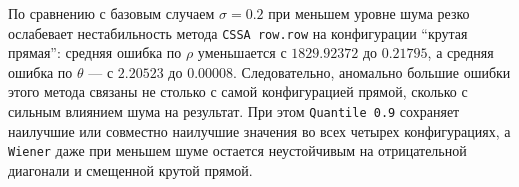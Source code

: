 По сравнению с базовым случаем $\sigma=0.2$ при меньшем уровне шума резко
ослабевает нестабильность метода \texttt{CSSA row.row} на конфигурации
``крутая прямая'': средняя ошибка по $\rho$ уменьшается с $1829.92372$ до
$0.21795$, а средняя ошибка по $\theta$ --- с $2.20523$ до $0.00008$.
Следовательно, аномально большие ошибки этого метода связаны не столько с самой
конфигурацией прямой, сколько с сильным влиянием шума на результат. При этом \texttt{Quantile 0.9} сохраняет наилучшие или совместно
наилучшие значения во всех четырех конфигурациях, а \texttt{Wiener} даже при
меньшем шуме остается неустойчивым на отрицательной диагонали и смещенной
крутой прямой.

\begin{table}[H]
	\centering
	\caption{Медианные ошибки оценивания параметра $\rho$ по конфигурациям прямой при $\sigma=0.05$}
	\label{tab:chapter3-rho-config-low-noise-median}
\end{table}

